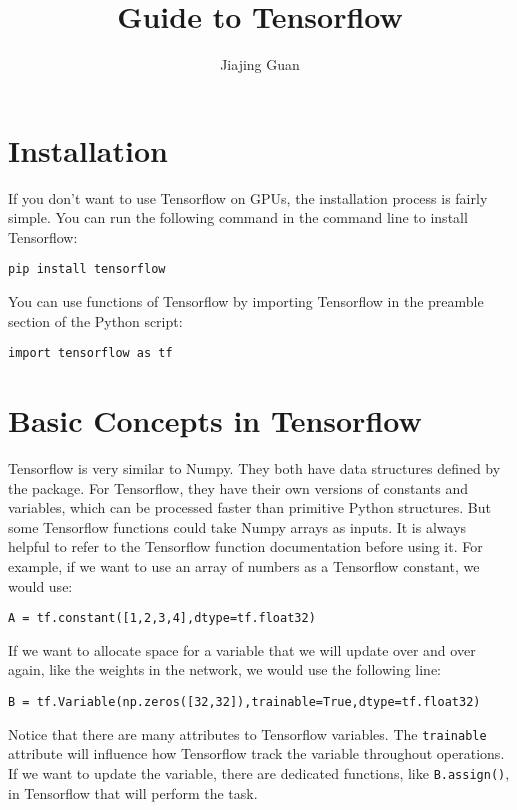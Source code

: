 \documentclass{article}
\title{Guide to Tensorflow}
\author{Jiajing Guan}
\begin{document}
\maketitle

\section{Installation}
If you don't want to use Tensorflow on GPUs, the installation process is fairly simple. You can run the following command in the command line to install Tensorflow:
\begin{center}
\texttt{pip install tensorflow}
\end{center}

You can use functions of Tensorflow by importing Tensorflow in the preamble section of the Python script:
\begin{center}
\texttt{import tensorflow as tf}
\end{center}

\section{Basic Concepts in Tensorflow}
Tensorflow is very similar to Numpy. They both have data structures defined by the package. For Tensorflow, they have their own versions of constants and variables, which can be processed faster than primitive Python structures. But some Tensorflow functions could take Numpy arrays as inputs. It is always helpful to refer to the Tensorflow function documentation before using it. For example, if we want to use an array of numbers as a Tensorflow constant, we would use:
\begin{center}
\texttt{A = tf.constant([1,2,3,4],dtype=tf.float32)}
\end{center}

If we want to allocate space for a variable that we will update over and over again, like the weights in the network, we would use the following line:
\begin{center}
\texttt{B = tf.Variable(np.zeros([32,32]),trainable=True,dtype=tf.float32)}
\end{center}

Notice that there are many attributes to Tensorflow variables. The \texttt{trainable} attribute will influence how Tensorflow track the variable throughout operations. If we want to update the variable, there are dedicated functions, like \texttt{B.assign()}, in Tensorflow that will perform the task. \\
\end{document}
